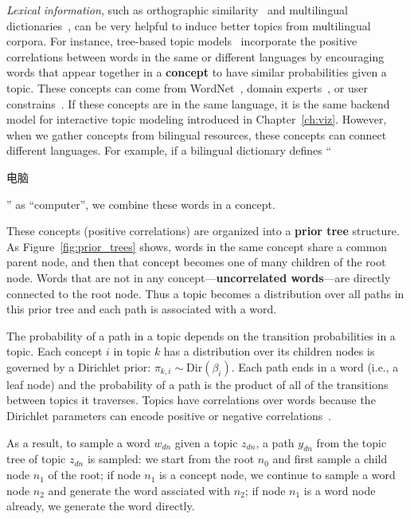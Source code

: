 \emph{Lexical information}, such as orthographic
similarity~\citep{boyd-graber-09} and multilingual
dictionaries~\citep{boyd-graber-10}, can be very helpful to induce
better topics from multilingual corpora. For instance, tree-based
topic models~\citep[\tlda{}]{boyd-graber-07,andrzejewski-09,hu-14:itm}
incorporate the positive correlations between words in the same or
different languages by encouraging words that appear together in a
{\bf concept} to have similar probabilities given a topic. These
concepts can come from WordNet~\citep{boyd-graber-10}, domain
experts~\citep{andrzejewski-09}, or user
constrains~\citep{hu-14:itm}. If these concepts are in the same
language, it is the same backend model for interactive topic modeling
introduced in Chapter~\ref{ch:viz}. However, when we gather concepts
from bilingual resources, these concepts can connect different
languages. For example, if a bilingual dictionary defines
``\begin{CJK*}{UTF8}{gbsn}电脑\end{CJK*}'' as ``computer'', we combine
  these words in a concept.

These concepts (positive correlations) are organized into a {\bf prior
  tree} structure. As Figure~\ref{fig:prior_trees} shows, words in the
same concept share a common parent node, and then that concept becomes
one of many children of the root node.  Words that are not in any
concept---{\bf uncorrelated words}---are directly connected to the
root node. Thus a topic becomes a distribution over all paths in this
prior tree and each path is associated with a word.

The probability of a path in a topic depends on the transition
probabilities in a topic.  Each concept $i$ in topic $k$ has a
distribution over its children nodes is governed by a Dirichlet prior:
$\pi_{k,i} \sim \text{Dir}(\beta_{i})$.  Each path ends in a word
(i.e., a leaf node) and the probability of a path is the product of
all of the transitions between topics it traverses. Topics have
correlations over words because the Dirichlet parameters can encode
positive or negative correlations~\citep{andrzejewski-09}.

As a result, to sample a word $w_{dn}$ given a topic $z_{dn}$, a path
$y_{dn}$ from the topic tree of topic $z_{dn}$ is sampled: we start
from the root $n_0$ and first sample a child node $n_1$ of the root;
if node $n_1$ is a concept node, we continue to sample a word node
$n_2$ and generate the word assciated with $n_2$; if node $n_1$ is a
word node already, we generate the word directly.

